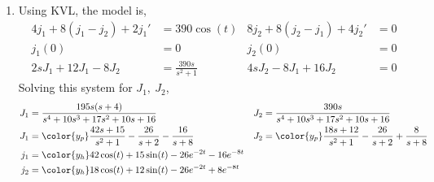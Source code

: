\begin{enumerate}
    \item Using KVL, the model is,
          \begin{align}
              4j_1 + 8(j_1 - j_2) + 2j_1' & = 390 \cos(t)          &
              8j_2 +8(j_2 - j_1) + 4j_2'  & = 0                      \\
              j_1(0)                      & = 0                    &
              j_2(0)                      & = 0                      \\
              2sJ_1 + 12J_1 - 8J_2        & = \frac{390s}{s^2 + 1} &
              4sJ_2 - 8J_1 + 16J_2        & = 0
          \end{align}
          Solving this system for $ J_1,\ J_2 $,
          \begin{align}
              J_1     & = \frac{195s(s + 4)}{s^4 + 10s^3 + 17s^2 + 10s + 16}        &
              J_2     & = \frac{390s}{s^4 + 10s^3 + 17s^2 + 10s + 16}                 \\
              J_1     & = \color{y_p} \frac{42s + 15}{s^2 + 1} - \frac{26}{s + 2}
              - \frac{16}
              {s + 8} &
              J_2     & = \color{y_p} \frac{18s + 12}{s^2 + 1} - \frac{26}{s + 2}
              + \frac{8}
              {s + 8}                                                                 \\
              j_1     & = \color{y_h} 42\cos(t) + 15\sin(t) - 26e^{-2t} - 16e^{-8t}   \\
              j_2     & = \color{y_h} 18\cos(t) + 12\sin(t) - 26e^{-2t} + 8e^{-8t}
          \end{align}


\end{enumerate}
